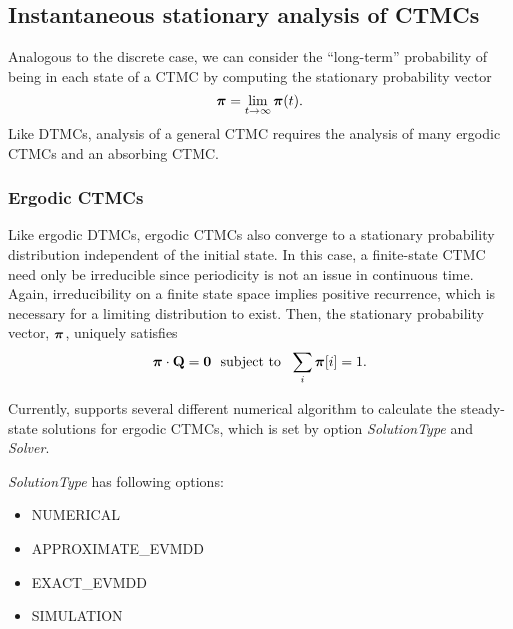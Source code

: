 \subsection{Instantaneous stationary analysis of CTMCs}
Analogous to the discrete case, we can consider the ``long-term'' probability
of being in each state of a CTMC by computing the
stationary probability vector
\[
\mbox{\boldmath{${\pi}$}} = \lim_{t \rightarrow \infty} \mbox{\boldmath{${\pi}$}}(t).
\]
Like DTMCs, analysis of a general CTMC requires the analysis of many
ergodic CTMCs and an absorbing CTMC.

\subsubsection{Ergodic CTMCs}

Like ergodic DTMCs, ergodic CTMCs also converge to a
stationary probability distribution
independent of the initial state.
In this case, a finite-state CTMC need only be
irreducible since periodicity is not an issue
in continuous time.  Again, irreducibility on a finite state space
implies positive recurrence, which is necessary for a limiting distribution to exist.
Then, the stationary probability vector, $\mbox{\boldmath{${\pi}$}}$, uniquely satisfies
\begin{equation}
  \gvect{\pi} \cdot \Q = \0 \ \mbox{ subject to }\ \sum_{i} \gvect{\pi}[i] = 1.
  \label{LS:ergCTMC}
\end{equation}


Currently, {\smart} supports several different numerical algorithm to calculate the steady-state solutions
for ergodic CTMCs, which is set by option \emph{SolutionType} and \emph{Solver}.

\emph{SolutionType} has following options:
\begin{itemize}
\item NUMERICAL
\item APPROXIMATE\_EVMDD
\item EXACT\_EVMDD
\item SIMULATION
\end{itemize}

